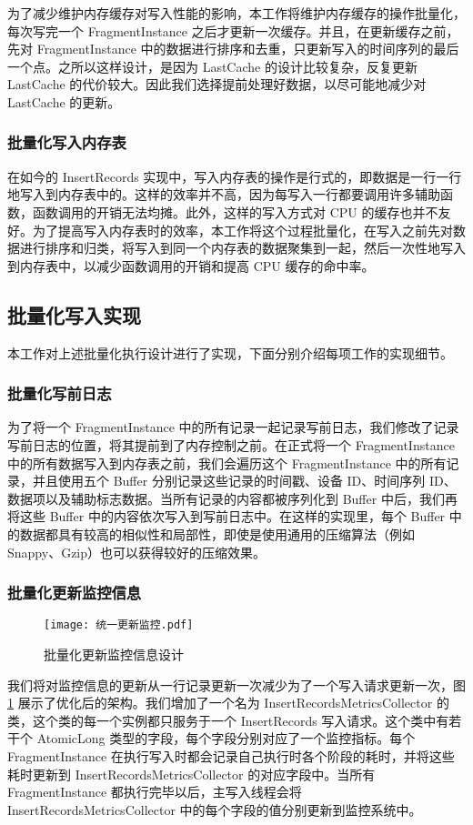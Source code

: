 为了减少维护内存缓存对写入性能的影响，本工作将维护内存缓存的操作批量化，每次写完一个 FragmentInstance 之后才更新一次缓存。并且，在更新缓存之前，先对 FragmentInstance 中的数据进行排序和去重，只更新写入的时间序列的最后一个点。之所以这样设计，是因为 LastCache 的设计比较复杂，反复更新 LastCache 的代价较大。因此我们选择提前处理好数据，以尽可能地减少对 LastCache 的更新。
\subsubsection{批量化写入内存表}
在如今的 InsertRecords 实现中，写入内存表的操作是行式的，即数据是一行一行地写入到内存表中的。这样的效率并不高，因为每写入一行都要调用许多辅助函数，函数调用的开销无法均摊。此外，这样的写入方式对 CPU 的缓存也并不友好\cite{boncz2005monetdb}。为了提高写入内存表时的效率，本工作将这个过程批量化，在写入之前先对数据进行排序和归类，将写入到同一个内存表的数据聚集到一起，然后一次性地写入到内存表中，以减少函数调用的开销和提高 CPU 缓存的命中率。

\subsection{批量化写入实现}
本工作对上述批量化执行设计进行了实现，下面分别介绍每项工作的实现细节。
\subsubsection{批量化写前日志}
为了将一个 FragmentInstance 中的所有记录一起记录写前日志，我们修改了记录写前日志的位置，将其提前到了内存控制之前。在正式将一个 FragmentInstance 中的所有数据写入到内存表之前，我们会遍历这个 FragmentInstance 中的所有记录，并且使用五个 Buffer 分别记录这些记录的时间戳、设备 ID、时间序列 ID、数据项以及辅助标志数据。当所有记录的内容都被序列化到 Buffer 中后，我们再将这些 Buffer 中的内容依次写入到写前日志中。在这样的实现里，每个 Buffer 中的数据都具有较高的相似性和局部性，即使是使用通用的压缩算法（例如 Snappy、Gzip）也可以获得较好的压缩效果。
\subsubsection{批量化更新监控信息}
\begin{figure}
  \centering
  \texttt{[image: 统一更新监控.pdf]}
  \caption{批量化更新监控信息设计}
  \label{fig:batch-update-monitor}
\end{figure}
我们将对监控信息的更新从一行记录更新一次减少为了一个写入请求更新一次，图 \ref{fig:batch-update-monitor} 展示了优化后的架构。我们增加了一个名为 InsertRecordsMetricsCollector 的类，这个类的每一个实例都只服务于一个 InsertRecords 写入请求。这个类中有若干个 AtomicLong 类型的字段，每个字段分别对应了一个监控指标。每个 FragmentInstance 在执行写入时都会记录自己执行时各个阶段的耗时，并将这些耗时更新到 InsertRecordsMetricsCollector 的对应字段中。当所有 FragmentInstance 都执行完毕以后，主写入线程会将 InsertRecordsMetricsCollector 中的每个字段的值分别更新到监控系统中。

